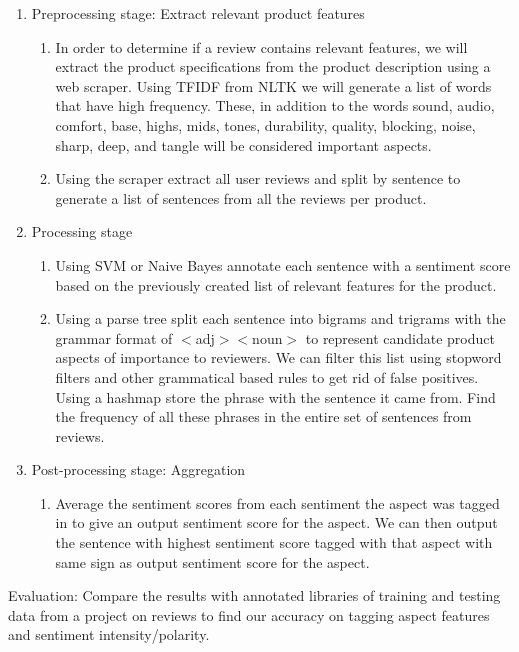 \documentclass{article}
\begin{document}
\begin{enumerate}
\item Preprocessing stage: Extract relevant product features
\newline 
	\begin{enumerate} [label* = \arabic*.]
	\item	In order to determine if a review contains relevant features, we will extract the product specifications from the product description using a web scraper. Using TFIDF from NLTK we will generate a list of words that have high frequency. These, in addition to the words sound, audio, comfort, base, highs, mids, tones, durability, quality, blocking, noise, sharp, deep, and tangle will be considered important aspects. 
	\\
	\item Using the scraper extract all user reviews and split by sentence to generate a list of sentences from all the reviews per product.
	\end{enumerate}
\item Processing stage
	\begin{enumerate} [label* = \arabic*.]
	\item Using SVM or Naive Bayes annotate each sentence with a sentiment score based on the previously created list of relevant features for the product. 
	\item Using a parse tree split each sentence into bigrams and trigrams with the grammar format of $<$adj$><$noun$>$ to represent candidate product aspects of importance to reviewers. We can filter this list using stopword filters and other grammatical based rules to get rid of false positives. Using a hashmap store the phrase with the sentence it came from. Find the frequency of all these phrases in the entire set of sentences from reviews.
	\end{enumerate}
\item Post-processing stage: Aggregation
	\begin{enumerate}[label* = \arabic*.]
	\item Average the sentiment scores from each sentiment the aspect was tagged in to give an output sentiment score for the aspect. We can then output the sentence with highest sentiment score tagged with that aspect with same sign as output sentiment score for the aspect.
	\end{enumerate}
\end{enumerate}
Evaluation: Compare the results with annotated libraries of training and testing data from a project on reviews to find our accuracy on tagging aspect features and sentiment intensity/polarity.
\end{document}
